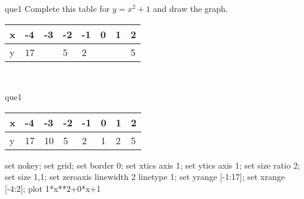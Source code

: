 \documentclass[13.5pt, varwidth=true]{beamer}
\begin{document}
\begin{frame}[shrink=19,fragile]
	\begin{beamercolorbox}[rounded=true, left, shadow=true,wd=14.8cm]{que1}
		 Complete this table for $y = x^{2} + 1$ and draw the graph. \\[0.3cm] \renewcommand{\arraystretch}{1.2}\begin{tabular}{|C|C|C|C|C|C|C|C|} \hline x & -4 & -3 & -2 & -1 & 0 & 1 & 2 \\ \hline y & 17 &  & 5 & 2 &  &  & 5\\ \hline \end{tabular}\\[0.3cm]
	\end{beamercolorbox}
\end{frame}
\begin{frame}[shrink=19,fragile]
	\begin{beamercolorbox}[rounded=true, left, shadow=true,wd=14.8cm]{que1}
		\renewcommand{\arraystretch}{1.2}\begin{tabular}{|C|C|C|C|C|C|C|C|} \hline x & -4 & -3 & -2 & -1 & 0 & 1 & 2 \\ \hline y & 17 & 10 & 5 & 2 & 1 & 2 & 5\\ \hline \end{tabular}\begin{gnuplot}[terminal=pdf] set nokey; set grid; set border 0; set xtics axis 1; set ytics axis 1; set size ratio 2; set size 1,1; set zeroaxis linewidth 2 linetype 1; set yrange [-1:17]; set xrange [-4:2]; plot 1*x**2+0*x+1 \end{gnuplot}
	\end{beamercolorbox}
\end{frame}
\end{document}
